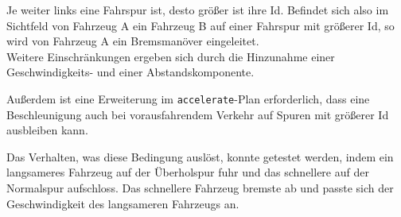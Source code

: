 Je weiter links eine Fahrspur ist, desto größer ist ihre Id.
Befindet sich also im Sichtfeld von Fahrzeug A ein Fahrzeug B auf einer Fahrspur mit größerer Id, so wird von Fahrzeug A ein Bremsmanöver eingeleitet.
\\
Weitere Einschränkungen ergeben sich durch die Hinzunahme einer Geschwindigkeits- und einer Abstandskomponente.

Außerdem ist eine Erweiterung im \texttt{accelerate}-Plan erforderlich, dass eine Beschleunigung auch bei vorausfahrendem Verkehr auf Spuren mit größerer Id ausbleiben kann.

Das Verhalten, was diese Bedingung auslöst, konnte getestet werden, indem ein langsameres Fahrzeug auf der Überholspur fuhr und das schnellere auf der Normalspur aufschloss.
Das schnellere Fahrzeug bremste ab und passte sich der Geschwindigkeit des langsameren Fahrzeugs an.
